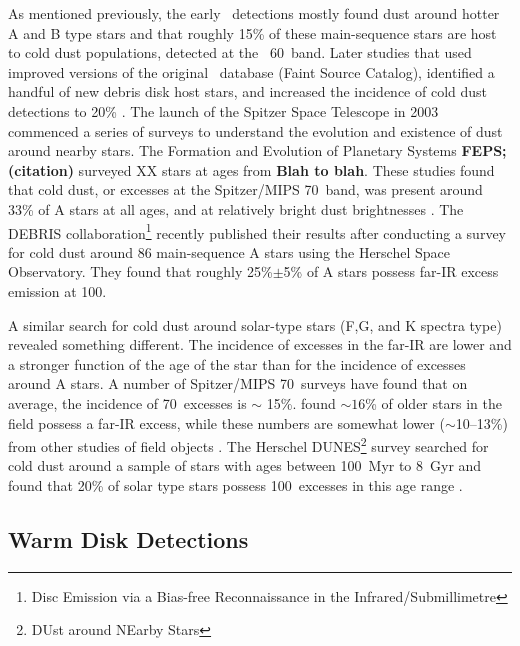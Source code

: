    As mentioned previously, the early \iras\ detections mostly found dust around hotter A and B type stars and that roughly 15\% of these main-sequence stars are host to cold dust populations, detected at the \iras\ 60\micron\ band. Later studies that used improved versions of the original \iras\ database (Faint Source Catalog), identified a handful of new debris disk host stars, and increased the incidence of cold dust detections to 20\% \citep{Rhee2007}. The launch of the Spitzer Space Telescope in 2003 commenced a series of surveys to understand the evolution and existence of dust around nearby stars. The Formation and Evolution of Planetary Systems  \textbf{FEPS; (citation)} surveyed XX stars at ages from \textbf{Blah to blah}.  These studies found that cold dust, or excesses at the Spitzer/MIPS 70\micron\ band, was present around 33\% of A stars at all ages, and at relatively bright dust brightnesses \citep{Su2006}. The DEBRIS collaboration\footnote{Disc Emission via a Bias-free Reconnaissance in the Infrared/Submillimetre} recently published their results after conducting a survey for cold dust around 86 main-sequence A stars using the Herschel Space Observatory. They found that roughly 25\%$\pm$5\% of A stars possess far-IR excess emission at 100\micron \citep{Thureau2014}. 
   
   
   A similar search for cold dust around solar-type stars (F,G, and K spectra type) revealed something different. The incidence of excesses in the far-IR are lower and a stronger function of the age of the star than for the incidence of excesses around A stars. A number of Spitzer/MIPS 70\micron\ surveys \citep[e.g.,][]{Trilling2008, Bryden2006, Beichman2006, Hillenbrand2008} have found that on average, the incidence of 70\micron\ excesses is $\sim$ 15\%. \citet{Trilling2008} found $\sim16$\% of older stars in the field possess a far-IR excess, while these numbers are somewhat lower ($\sim$10--13\%) from other studies of field objects \citep{Beichman2006, Bryden2006}. The Herschel DUNES\footnote{DUst around NEarby Stars} survey searched for cold dust around a sample of stars with ages between 100~Myr to 8~Gyr and found that 20\% of solar type stars possess 100\micron\ excesses in this age range \citep{Eiroa2013}. 
   
   
   \subsection{Warm Disk Detections}
   
